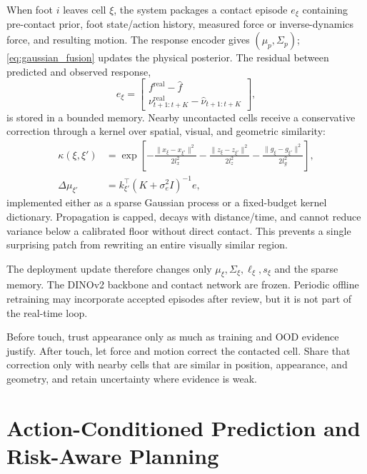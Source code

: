 When foot $i$ leaves cell $\xi$, the system packages a contact episode $e_\xi$ containing pre-contact prior, foot state/action history, measured force or inverse-dynamics force, and resulting motion. The response encoder gives $(\mu_p,\Sigma_p)$; \cref{eq:gaussian_fusion} updates the physical posterior. The residual between predicted and observed response,
\begin{equation}
e_\xi=\begin{bmatrix}f^{\mathrm{real}}-\hat f\\
\nu_{t+1:t+K}^{\mathrm{real}}-\hat\nu_{t+1:t+K}\end{bmatrix},
\label{eq:online_residual}
\end{equation}
is stored in a bounded memory. Nearby uncontacted cells receive a conservative correction through a kernel over spatial, visual, and geometric similarity:
\begin{align}
\kappa(\xi,\xi') &=
\exp\!\left[-\frac{\lVert x_\xi-x_{\xi'}\rVert^2}{2l_x^2}
-\frac{\lVert z_\xi-z_{\xi'}\rVert^2}{2l_z^2}
-\frac{\lVert g_\xi-g_{\xi'}\rVert^2}{2l_g^2}\right],\\
\Delta\mu_{\xi'} &= k_{\xi'}^\top(K+\sigma_e^2I)^{-1}e,
\label{eq:kernel_update}
\end{align}
implemented either as a sparse Gaussian process or a fixed-budget kernel dictionary. Propagation is capped, decays with distance/time, and cannot reduce variance below a calibrated floor without direct contact. This prevents a single surprising patch from rewriting an entire visually similar region.

The deployment update therefore changes only $\mu_\xi,\Sigma_\xi,\ell_\xi,s_\xi$ and the sparse memory. The DINOv2 backbone and contact network are frozen. Periodic offline retraining may incorporate accepted episodes after review, but it is not part of the real-time loop.

\begin{keybox}
Before touch, trust appearance only as much as training and OOD evidence justify. After touch, let force and motion correct the contacted cell. Share that correction only with nearby cells that are similar in position, appearance, and geometry, and retain uncertainty where evidence is weak.
\end{keybox}



\section{Action-Conditioned Prediction and Risk-Aware Planning}
\label{sec:planning}

